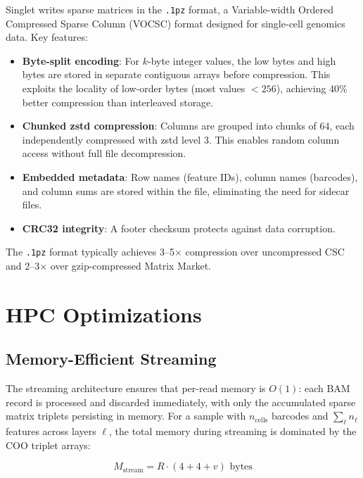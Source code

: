 \documentclass[11pt,a4paper]{article}
\begin{document}
Singlet writes sparse matrices in the \texttt{.1pz} format, a Variable-width Ordered Compressed Sparse Column (VOCSC) format designed for single-cell genomics data. Key features:

\begin{itemize}
    \item \textbf{Byte-split encoding}: For $k$-byte integer values, the low bytes and high bytes are stored in separate contiguous arrays before compression. This exploits the locality of low-order bytes (most values $< 256$), achieving 40\% better compression than interleaved storage.
    
    \item \textbf{Chunked zstd compression}: Columns are grouped into chunks of 64, each independently compressed with zstd level 3. This enables random column access without full file decompression.
    
    \item \textbf{Embedded metadata}: Row names (feature IDs), column names (barcodes), and column sums are stored within the file, eliminating the need for sidecar files.
    
    \item \textbf{CRC32 integrity}: A footer checksum protects against data corruption.
\end{itemize}

The \texttt{.1pz} format typically achieves 3--5$\times$ compression over uncompressed CSC and 2--3$\times$ over gzip-compressed Matrix Market.

\section{HPC Optimizations}\label{sec:hpc}

\subsection{Memory-Efficient Streaming}

The streaming architecture ensures that per-read memory is $O(1)$: each BAM record is processed and discarded immediately, with only the accumulated sparse matrix triplets persisting in memory. For a sample with $n_\text{cells}$ barcodes and $\sum_\ell n_\ell$ features across layers $\ell$, the total memory during streaming is dominated by the COO triplet arrays:

\begin{equation}
M_\text{stream} = R \cdot (4 + 4 + v) \text{ bytes}
\end{equation}
\end{document}
